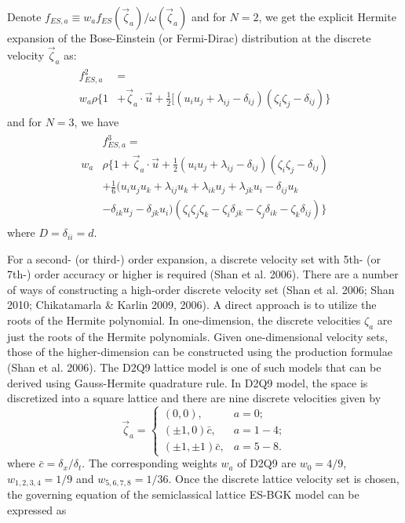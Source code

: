 \documentclass[doublecol]{epl2}
\begin{document}
Denote $f_{ES,a} \equiv w_{a} f_{ES}(\vec\zeta_a )/{\omega(\vec\zeta_a )}$ and for $N=2$, we get the explicit Hermite expansion of the Bose-Einstein (or Fermi-Dirac) distribution at the discrete velocity $\vec \zeta_a$ as:
\begin{align}
\begin{split}
f_{ES,a}^{2} &=  \\
w_a \rho \{ 1 &+ \vec \zeta_a \cdot \vec u + \frac{1}{2} [( u_i u_j +\lambda_{ij} -\delta_{ij})(\zeta_i \zeta_j - \delta_{ij}) \}
\end{split}
\end{align}
and for $N=3$, we have
\begin{align}
\begin{split}
&f_{ES,a}^{3} =  \\
w_a &\rho \{ 1 + \vec \zeta_a \cdot \vec u + \frac{1}{2} ( u_i u_j +\lambda_{ij} -\delta_{ij})(\zeta_i \zeta_j - \delta_{ij}) \\
&+ \frac{1}{6} (u_{i} u_{j} u_{k} + \lambda_{i j} u_{k} + \lambda_{i k} u_{j} + \lambda_{j k} u_{i} - \delta_{i j} u_{k} \\
&- \delta_{i k} u_{j} - \delta_{j k} u_{i})(\zeta _{i} \zeta _{j} \zeta _{k}-\zeta _{i}\delta_{jk} -\zeta _{j}\delta _{ik} -\zeta _{k} \delta _{ij}) \}
\end{split}
\end{align}
where $D=\delta_{ii}=d$.

For a second- (or third-) order expansion, a discrete velocity set with 5th- (or 7th-) order accuracy or higher is required (Shan et al. 2006). There are a number of ways of constructing a high-order discrete velocity set (Shan et al. 2006; Shan 2010; Chikatamarla \& Karlin 2009, 2006).
A direct approach is to utilize the roots of the Hermite polynomial. In one-dimension, the discrete velocities $\zeta_a$ are just the roots of the Hermite polynomials.  Given one-dimensional velocity sets, those of the higher-dimension can be constructed using the production formulae (Shan et al. 2006).
The D2Q9 lattice model is one of such models that can be derived using Gauss-Hermite quadrature rule.  In D2Q9 model, the space is discretized into a square lattice and there are nine discrete velocities given by
\begin{equation}
\vec \zeta_a =
  \begin{cases}
   (0, 0), & a =0; \\
   (\pm 1, 0) \bar{c}, &  a=1-4; \\
   (\pm 1, \pm 1) \bar{c}, & a=5-8.
  \end{cases}
\end{equation}
where $\bar{c} = \delta_x/\delta_t$. The corresponding weights $w_a$ of D2Q9 are $w_0=4/9$, $w_{1,2,3,4}=1/9$ and $w_{5,6,7,8}=1/36$.
Once the discrete lattice velocity set is chosen, the governing equation of the semiclassical lattice ES-BGK model can be expressed as
\end{document}
